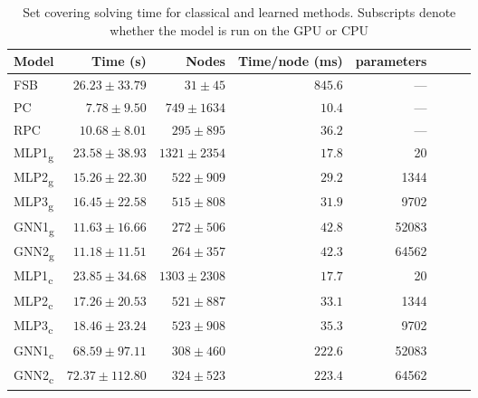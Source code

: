 \begin{scriptsize}
\begin{table}[ht]
	\centering
	\begin{tabular}{lrrrrrrr}
		\toprule
		Model & Time (s) & Nodes  & Time/node (ms) & parameters \\
		\midrule
		FSB & $26.23 \pm  33.79$ & $31 \pm 45$ & $845.6$ & ---\\
		PC  & $7.78 \pm 9.50$ & $749 \pm 1634$ & $10.4$ & ---\\
		RPC & $10.68 \pm 8.01$ & $295 \pm 895$ & $36.2$ & ---\\
		\addlinespace
		MLP1\textsubscript{g} & $23.58 \pm 38.93$ &  $1321 \pm 2354$ &  $  17.8$& 20\\
		MLP2\textsubscript{g} & $15.26 \pm 22.30 $ &  $ 522 \pm  909 $ &  $  29.2$ & 1344\\
		MLP3\textsubscript{g} & $16.45 \pm 22.58$ & $515 \pm 808 $  & $31.9$ & 9702\\
		GNN1\textsubscript{g} & $11.63 \pm 16.66$ & $272 \pm 506 $  & $42.8$ & 52083\\
		GNN2\textsubscript{g} & $\mathbf{11.18 \pm 11.51}$ & $264 \pm 357 $  & $42.3$ & 64562\\
		\addlinespace
		MLP1\textsubscript{c} & $23.85 \pm 34.68$ & $1303 \pm 2308$ & $17.7$ & 20\\
		MLP2\textsubscript{c} & $17.26 \pm 20.53$ & $521 \pm 887$   & $33.1$ & 1344\\
		MLP3\textsubscript{c} & $18.46 \pm 23.24$ & $523 \pm  908$  & $35.3$ & 9702\\
		GNN1\textsubscript{c} & $68.59 \pm 97.11$ & $308 \pm 460$   & $222.6$ & 52083\\
		GNN2\textsubscript{c} & $72.37 \pm 112.80$ & $324 \pm 523$  & $223.4$ & 64562\\
		\bottomrule
	\end{tabular}
	\caption{Set covering solving time for classical and learned methods. Subscripts denote whether the model is run on the \gls{GPU} or \gls{CPU}}\label{tab:results1_set}
\end{table}
\end{scriptsize}
